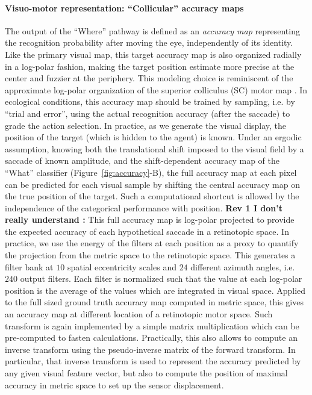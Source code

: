 \paragraph{Visuo-motor representation: ``Collicular'' accuracy maps}

The output of the ``Where'' pathway is defined as an \emph{accuracy map} representing the recognition probability after moving the eye, independently of its identity. Like the primary visual map, this target accuracy map is also organized radially in a log-polar fashion, making the target position estimate more precise at the center and fuzzier at the periphery. This modeling choice is reminiscent of the approximate log-polar organization of the superior colliculus (SC) motor map \cite{sparks1987sensory}. In ecological conditions, this accuracy map should be trained by sampling, i.e. by ``trial and error'', using the actual recognition accuracy (after the saccade) to grade the action selection.
In practice, as we generate the visual display, the position of the target (which is hidden to the agent) is known.
Under an ergodic assumption, knowing both the translational shift imposed to the visual field by a saccade of known amplitude, and the shift-dependent accuracy map of the  ``What'' classifier (Figure~\ref{fig:accuracy}-B), the full accuracy map at each pixel can be predicted for each visual sample by shifting the central accuracy map on the true position of the target. Such a computational shortcut is allowed by the independence of the categorical performance with position. %
{\color{magenta} \textbf{Rev 1 I don't really understand : }}{\color{blue} This full accuracy map is log-polar projected to provide the expected accuracy of each hypothetical saccade in a retinotopic space. In practice, we use the energy of the filters at each position as a proxy to quantify the projection from the metric space to the retinotopic space. This generates a filter bank at $10$ spatial eccentricity scales and $24$ different azimuth angles, i.e. $240$ output filters. Each filter is normalized such that the value at each log-polar position is the average of the values which are integrated in visual space. Applied to the full sized ground truth accuracy map computed in metric space, this gives an accuracy map at different location of a retinotopic motor space. Such transform is again implemented by a simple matrix multiplication which can be pre-computed to fasten calculations.} Practically, this also allows to compute an inverse transform using the pseudo-inverse matrix of the forward transform. In particular, that inverse transform is used to represent the accuracy predicted by any given visual feature vector, but also to compute the position of maximal accuracy in metric space to set up the sensor displacement.

